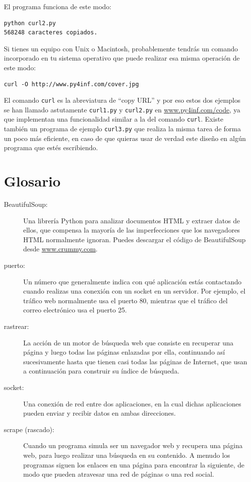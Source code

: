 El programa funciona de este modo:

\beforeverb
\begin{verbatim}
python curl2.py 
568248 caracteres copiados.
\end{verbatim}
\afterverb
%

Si tienes un equipo con Unix o Macintosh, probablemente tendrás un comando
incorporado en tu sistema operativo que puede realizar esa misma operación
de este modo:

\beforeverb
\begin{verbatim}
curl -O http://www.py4inf.com/cover.jpg
\end{verbatim}
\afterverb
%
El comando {\tt curl} es la abreviatura de ``copy URL'' y por eso estos dos
ejemplos se han llamado astutamente {\tt curl1.py} y {\tt curl2.py} en
\url{www.py4inf.com/code}, ya que implementan una funcionalidad similar
a la del comando {\tt curl}. Existe también un programa de ejemplo {\tt curl3.py}
que realiza la misma tarea de forma un poco más eficiente, en caso de
que quieras usar de verdad este diseño en algún programa que estés escribiendo.

\section{Glosario}

\begin{description}

\item[BeautifulSoup:] Una librería Python para analizar documentos HTML
y extraer datos de ellos,
que compensa la mayoría de las imperfecciones que los navegadores HTML
normalmente ignoran.
Puedes descargar el código de BeautifulSoup
desde
\url{www.crummy.com}.

\item[puerto:] Un número que generalmente indica con qué aplicación
estás contactando cuando realizas una conexión con un socket en un servidor.
Por ejemplo, el tráfico web normalmente usa el puerto 80, mientras que el tráfico
del correo electrónico usa el puerto 25.

\item[rastrear:] La acción de un motor de búsqueda web que consiste en recuperar una página
y luego todas las páginas enlazadas por ella, continuando así sucesivamente hasta que
tienen casi todas las páginas de Internet, que
usan a continuación para construir su índice de búsqueda.

\item[socket:] Una conexión de red entre dos aplicaciones,
en la cual dichas aplicaciones pueden enviar y recibir datos en ambas direcciones.

\item[scrape (rascado):] Cuando un programa simula ser un navegador web y
recupera una página web, para luego realizar una búsqueda en su contenido.
A menudo los programas siguen los enlaces en una página para encontrar la
siguiente, de modo que pueden atravesar una red de páginas o una red social.

\end{description}

